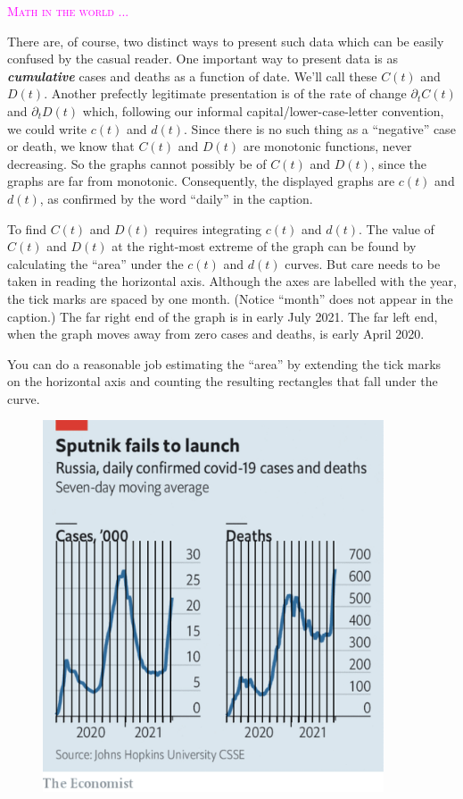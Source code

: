 \documentclass[
  letterpaper,
  DIV=11,
  numbers=noendperiod,
  oneside]{scrreprt}
\newenvironment{intheworld}%
{%
\textcolor{magenta}{\hrulefill}%
  \par\vspace{.3\baselineskip}%
  \textcolor{magenta}{\scshape Math in the world ...}%
  \par\vspace{\baselineskip}%
}%
{\textcolor{magenta}{\hrulefill}}
\begin{document}
\begin{intheworld}
There are, of course, two distinct ways to present such data which can
be easily confused by the casual reader. One important way to present
data is as \textbf{\emph{cumulative}} cases and deaths as a function of
date. We'll call these \(C(t)\) and \(D(t)\). Another prefectly
legitimate presentation is of the rate of change \(\partial_t C(t)\) and
\(\partial_t D(t)\) which, following our informal
capital/lower-case-letter convention, we could write \(c(t)\) and
\(d(t)\). Since there is no such thing as a ``negative'' case or death,
we know that \(C(t)\) and \(D(t)\) are monotonic functions, never
decreasing. So the graphs cannot possibly be of \(C(t)\) and \(D(t)\),
since the graphs are far from monotonic. Consequently, the displayed
graphs are \(c(t)\) and \(d(t)\), as confirmed by the word ``daily'' in
the caption.

To find \(C(t)\) and \(D(t)\) requires integrating \(c(t)\) and
\(d(t)\). The value of \(C(t)\) and \(D(t)\) at the right-most extreme
of the graph can be found by calculating the ``area'' under the \(c(t)\)
and \(d(t)\) curves. But care needs to be taken in reading the
horizontal axis. Although the axes are labelled with the year, the tick
marks are spaced by one month. (Notice ``month'' does not appear in the
caption.) The far right end of the graph is in early July 2021. The far
left end, when the graph moves away from zero cases and deaths, is early
April 2020.

You can do a reasonable job estimating the ``area'' by extending the
tick marks on the horizontal axis and counting the resulting rectangles
that fall under the curve.

\begin{figure}

{\centering \includegraphics[width=0.9\textwidth,height=\textheight]{Accumulation/www/sputnik-bars.png}

}
\end{figure}
\end{intheworld}
\end{document}
